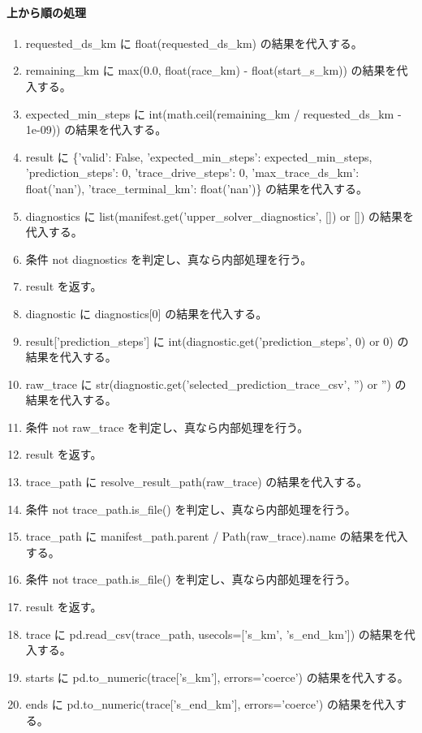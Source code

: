 \documentclass[a4paper,11pt]{article}
\begin{document}
            \paragraph{上から順の処理}
            \begin{enumerate}[leftmargin=1.8em]
            \item requested\_ds\_km に float(requested\_ds\_km) の結果を代入する。
\item remaining\_km に max(0.0, float(race\_km) - float(start\_s\_km)) の結果を代入する。
\item expected\_min\_steps に int(math.ceil(remaining\_km / requested\_ds\_km - 1e-09)) の結果を代入する。
\item result に \{'valid': False, 'expected\_min\_steps': expected\_min\_steps, 'prediction\_steps': 0, 'trace\_drive\_steps': 0, 'max\_trace\_ds\_km': float('nan'), 'trace\_terminal\_km': float('nan')\} の結果を代入する。
\item diagnostics に list(manifest.get('upper\_solver\_diagnostics', []) or []) の結果を代入する。
\item 条件 not diagnostics を判定し、真なら内部処理を行う。
\item   result を返す。
\item diagnostic に diagnostics[0] の結果を代入する。
\item result['prediction\_steps'] に int(diagnostic.get('prediction\_steps', 0) or 0) の結果を代入する。
\item raw\_trace に str(diagnostic.get('selected\_prediction\_trace\_csv', '') or '') の結果を代入する。
\item 条件 not raw\_trace を判定し、真なら内部処理を行う。
\item   result を返す。
\item trace\_path に resolve\_result\_path(raw\_trace) の結果を代入する。
\item 条件 not trace\_path.is\_file() を判定し、真なら内部処理を行う。
\item   trace\_path に manifest\_path.parent / Path(raw\_trace).name の結果を代入する。
\item 条件 not trace\_path.is\_file() を判定し、真なら内部処理を行う。
\item   result を返す。
\item trace に pd.read\_csv(trace\_path, usecols=['s\_km', 's\_end\_km']) の結果を代入する。
\item starts に pd.to\_numeric(trace['s\_km'], errors='coerce') の結果を代入する。
\item ends に pd.to\_numeric(trace['s\_end\_km'], errors='coerce') の結果を代入する。

\end{enumerate}
\end{document}
